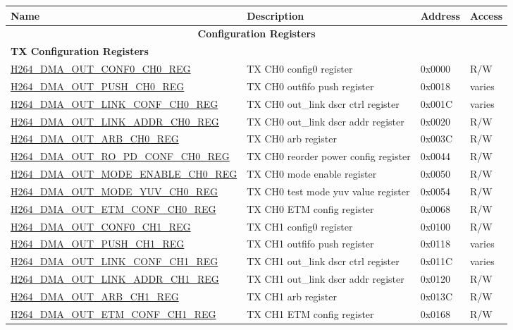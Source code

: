 \begin{longtable}{ | p{7.5cm} | p{5.7cm} | p{1.2cm} | p{1cm} | }
    \hline\rowcolor{lightgray}
    {\bfseries Name} & {\bfseries Description} &  {\bfseries Address} & {\bfseries Access} \\ \hline
    \endhead
    \multicolumn{4}{|c|}{\cellcolor{gray!15}\textbf{Configuration Registers}} \\ \hline
    \multicolumn{4}{|l|}{\textbf{TX Configuration Registers}} \\ \hline
    \hyperref[regdesc:H264DMAOUTCONF0CH0REG]{H264\_DMA\_OUT\_CONF0\_CH0\_REG} & TX CH0 config0 register & 0x0000 & R/W \\ \hline
    \hyperref[regdesc:H264DMAOUTPUSHCH0REG]{H264\_DMA\_OUT\_PUSH\_CH0\_REG} & TX CH0 outfifo push register & 0x0018 & varies \\ \hline
    \hyperref[regdesc:H264DMAOUTLINKCONFCH0REG]{H264\_DMA\_OUT\_LINK\_CONF\_CH0\_REG} & TX CH0 out\_link dscr ctrl register & 0x001C & varies \\ \hline
    \hyperref[regdesc:H264DMAOUTLINKADDRCH0REG]{H264\_DMA\_OUT\_LINK\_ADDR\_CH0\_REG} & TX CH0 out\_link dscr addr register & 0x0020 & R/W \\ \hline
    \hyperref[regdesc:H264DMAOUTARBCH0REG]{H264\_DMA\_OUT\_ARB\_CH0\_REG} & TX CH0 arb register & 0x003C & R/W \\ \hline
    \hyperref[regdesc:H264DMAOUTROPDCONFCH0REG]{H264\_DMA\_OUT\_RO\_PD\_CONF\_CH0\_REG} & TX CH0 reorder power config register & 0x0044 & R/W \\ \hline
    \hyperref[regdesc:H264DMAOUTMODEENABLECH0REG]{H264\_DMA\_OUT\_MODE\_ENABLE\_CH0\_REG} & TX  CH0 mode enable register & 0x0050 & R/W \\ \hline
    \hyperref[regdesc:H264DMAOUTMODEYUVCH0REG]{H264\_DMA\_OUT\_MODE\_YUV\_CH0\_REG} & TX  CH0 test mode yuv value register & 0x0054 & R/W \\ \hline
    \hyperref[regdesc:H264DMAOUTETMCONFCH0REG]{H264\_DMA\_OUT\_ETM\_CONF\_CH0\_REG} & TX CH0 ETM config register & 0x0068 & R/W \\ \hline
    
    \hyperref[regdesc:H264DMAOUTCONF0CH1REG]{H264\_DMA\_OUT\_CONF0\_CH1\_REG} & TX CH1 config0 register & 0x0100 & R/W \\ \hline
    \hyperref[regdesc:H264DMAOUTPUSHCH1REG]{H264\_DMA\_OUT\_PUSH\_CH1\_REG} & TX CH1 outfifo push register & 0x0118 & varies \\ \hline
    \hyperref[regdesc:H264DMAOUTLINKCONFCH1REG]{H264\_DMA\_OUT\_LINK\_CONF\_CH1\_REG} & TX CH1 out\_link dscr ctrl register & 0x011C & varies \\ \hline
    \hyperref[regdesc:H264DMAOUTLINKADDRCH1REG]{H264\_DMA\_OUT\_LINK\_ADDR\_CH1\_REG} & TX CH1 out\_link dscr addr register & 0x0120 & R/W \\ \hline
    \hyperref[regdesc:H264DMAOUTARBCH1REG]{H264\_DMA\_OUT\_ARB\_CH1\_REG} & TX CH1 arb register & 0x013C & R/W \\ \hline
    \hyperref[regdesc:H264DMAOUTETMCONFCH1REG]{H264\_DMA\_OUT\_ETM\_CONF\_CH1\_REG} & TX CH1 ETM config register & 0x0168 & R/W \\ \hline
    

\end{longtable}
